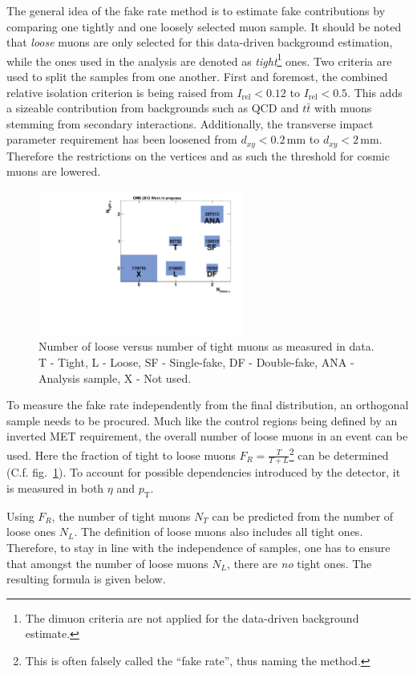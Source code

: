 The general idea of the fake rate method is to estimate fake contributions by comparing one tightly and one loosely selected muon sample. It should be noted that \textit{loose} muons are only selected for this data-driven background estimation, while the ones used in the analysis are denoted as \textit{tight}\footnote{The dimuon criteria are not applied for the data-driven background estimate.} ones. Two criteria are used to split the samples from one another. First and foremost, the combined relative isolation criterion is being raised from $I_{\text{rel}} < 0.12$ to $I_{\text{rel}} < 0.5$. This adds a sizeable contribution from backgrounds such as QCD and $t \bar{t}$ with muons stemming from secondary interactions. Additionally, the transverse impact parameter requirement has been loosened from $d_{xy} < 0.2\,\text{mm}$ to $d_{xy} < 2\,\text{mm}$. Therefore the restrictions on the vertices and as such the threshold for cosmic muons are lowered.

\begin{figure}[ht!]
  \centering
    \includegraphics[width=0.6\textwidth]{plots/nloosetight.pdf}
  \caption{Number of loose versus number of tight muons as measured in data. T - Tight, L - Loose, SF - Single-fake, DF - Double-fake, ANA - Analysis sample, X - Not used.}
  \label{fig:nloosetight}
\end{figure}

To measure the fake rate independently from the final distribution, an orthogonal sample needs to be procured. Much like the control regions being defined by an inverted MET requirement, the overall number of loose muons in an event can be used. Here the fraction of tight to loose muons $F_R = \frac{T}{T+L}$\footnote{This is often falsely called the ``fake rate'', thus naming the method.} can be determined (C.f. fig.~\ref{fig:nloosetight}). To account for possible dependencies introduced by the detector, it is measured in both $\eta$ and $p_{\text{T}}$. 

Using $F_R$, the number of tight muons $N_T$ can be predicted from the number of loose ones $N_L$. The definition of loose muons also includes all tight ones. Therefore, to stay in line with the independence of samples, one has to ensure that amongst the number of loose muons $N_L$, there are \textit{no} tight ones. The resulting formula is given below.

